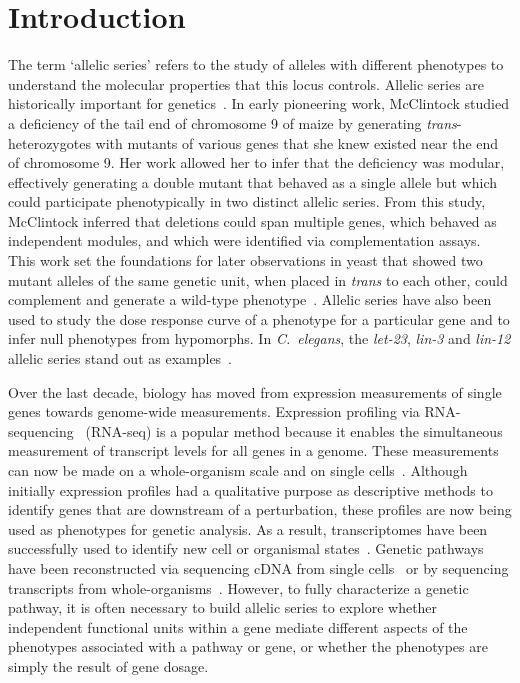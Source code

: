 \documentclass[10pt, twocolumn]{article}
\newcommand{\cel}{\emph{C.~elegans}}
\newcommand{\gene}[1]{\mbox{\emph{#1}}}
\begin{document}
\section*{Introduction}
The term `allelic series' refers to the study of alleles with different
phenotypes to understand the molecular properties that this locus controls.
Allelic series are historically important for genetics~\cite{McClintock1944}.
In early pioneering work, McClintock studied a deficiency of the tail end of
chromosome 9 of maize by generating \emph{trans}-heterozygotes with mutants of
various genes that she knew existed near the end of chromosome 9. Her work
allowed her to infer that the deficiency was modular, effectively generating a
double mutant that behaved as a single allele but which could participate
phenotypically in two distinct allelic series. From this study, McClintock
inferred that deletions could span multiple genes, which behaved as independent
modules, and which were identified via complementation assays. This work set the
foundations for later observations in yeast that showed two mutant alleles of
the same genetic unit, when placed in \emph{trans} to each other, could
complement and generate a wild-type phenotype~\cite{FINCHAM1957}. Allelic series
have also been used to study the dose response curve of a phenotype for a
particular gene and to infer null phenotypes from hypomorphs. In \cel{}, the
\gene{let-23}, \gene{lin-3} and \gene{lin-12} allelic series stand out as
examples~\cite{Aroian1991,Ferguson1985a,Greenwald1983}.

Over the last decade, biology has moved from expression measurements of single
genes towards genome-wide measurements. Expression profiling via
RNA-sequencing~\cite{Mortazavi2008} (RNA-seq) is a popular method because it
enables the simultaneous measurement of transcript levels for all genes in a
genome. These measurements can now be made on a whole-organism scale and on
single cells~\cite{Tang2009}. Although initially expression profiles had a
qualitative purpose as descriptive methods to identify genes that are downstream
of a perturbation, these profiles are now being used as phenotypes for genetic
analysis. As a result, transcriptomes have been successfully used to identify
new cell or organismal states~\cite{Angeles-Albores2017,Villani2017}. Genetic
pathways have been reconstructed via sequencing cDNA from single
cells~\cite{Dixit2016} or by sequencing transcripts from
whole-organisms~\cite{AngelesAlboresHIF}. However, to fully characterize a
genetic pathway, it is often necessary to build allelic series to explore
whether independent functional units within a gene mediate different aspects of
the phenotypes associated with a pathway or gene, or whether the phenotypes are
simply the result of gene dosage.
\end{document}
